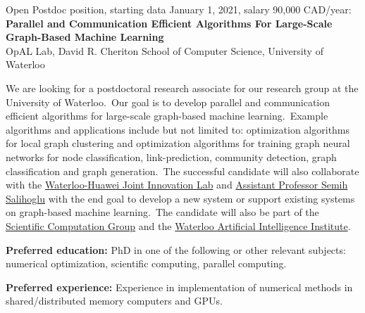 \documentclass[12pt]{article}
\begin{document}
\begin{center}
{Open Postdoc position, starting data January 1, 2021, salary 90,000 CAD/year: \\\vspace{0.2cm} \bf Parallel and Communication Efficient Algorithms For Large-Scale Graph-Based Machine Learning} \\\vspace{0.2cm} {OpAL Lab, David R. Cheriton School of Computer Science, University of Waterloo}\\
\end{center}

We are looking for a postdoctoral research associate for our research group at the University of Waterloo.\ Our goal is to develop parallel and communication efficient algorithms for large-scale graph-based machine learning.\ 
Example algorithms and applications include but not limited to: optimization algorithms for local graph clustering and optimization algorithms for training graph neural networks for node classification, link-prediction, community detection, graph classification and graph generation.\
The successful candidate will also collaborate with the \href{https://www.huawei.com/ca/news/ca-en/20161111huawei-and-university-of-waterloo-partner-for-world-class-research-and-innovation}{Waterloo-Huawei Joint Innovation Lab}  and \href{https://cs.uwaterloo.ca/~ssalihog/}{Assistant Professor Semih Salihoglu} with the end goal to develop a new system or support existing systems on graph-based machine learning.\ The candidate will also be part of the \href{https://scicom.uwaterloo.ca}{Scientific Computation Group} and the \href{https://uwaterloo.ca/artificial-intelligence-institute/}{Waterloo Artificial Intelligence Institute}.\\\vspace{-0.3cm}

\noindent \textbf{Preferred education:} PhD in one of the following or other relevant subjects: numerical optimization, scientific computing, parallel computing.\\\vspace{-0.3cm}

\noindent \textbf{Preferred experience:} Experience in implementation of numerical methods in shared/distributed memory computers and GPUs. \\\vspace{-0.3cm}

\end{document}
